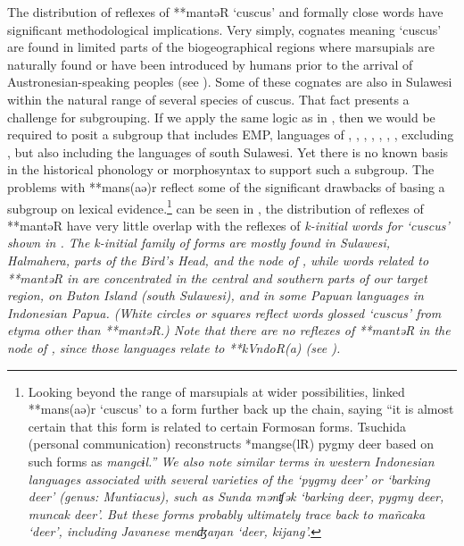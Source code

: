 The distribution of reflexes of **mantəR ‘cuscus’
and formally close words have significant methodological implications.
Very simply, cognates meaning ‘cuscus’ are found in limited parts
of the biogeographical regions where marsupials are naturally
found or have been introduced by humans prior to the arrival
of Austronesian-speaking peoples (see ).
Some of these cognates are also in Sulawesi within the natural
range of several species of cuscus.
That fact presents a challenge for subgrouping.
If we apply the same logic as in \citet{Blust1982,
Blust1993,Blust2009,Blust2012b}, then we would be required to posit a subgroup
that includes EMP, languages of , ,
, , , ,
, excluding ,
but also including the  languages of south Sulawesi.
Yet there is no known basis in the historical phonology or morphosyntax
to support such a subgroup.
The problems with **mans(aə)r reflect some of the significant
drawbacks of basing a subgroup on lexical evidence.\footnote{
		Looking beyond the range of marsupials at wider possibilities,
		\citet[143, endnote 72]{Collins1983} linked **mans(aə)r ‘cuscus’ to
		a form further back up the chain,
		saying “it is almost certain that this form is related to certain Formosan forms.
		Tsuchida (personal communication) reconstructs *mangse(lR) pygmy
		deer based on such forms as  \it{mangcɨl}.” We also note
		similar terms in western Indonesian languages associated with
		several varieties of the ‘pygmy deer’ or ‘barking deer’ (genus:
		\it{Muntiacus}), such as Sunda \it{mənʧək} ‘barking deer,
		pygmy deer, muncak deer’.
		But these forms probably ultimately trace back to  \it{mañcaka}
		‘deer’, including Javanese \it{menʤaŋan} ‘deer,
		kijang’.} 
 can be seen in ,
the distribution of reflexes of **mantəR have very little overlap
with the reflexes of \it{k}-initial words for ‘cuscus’ shown in .
The \it{k}-initial family of forms are mostly found in Sulawesi,
Halmahera, parts of the Bird's Head,
and the  node of ,
while words related to **mantəR in  are concentrated
in the central and southern parts of our target region,
on Buton Island (south Sulawesi),
and in some Papuan languages in Indonesian Papua.
(White circles or squares reflect words glossed ‘cuscus’ from
etyma other than **mantəR.) Note that there are no reflexes of
**mantəR in the  node of ,
since those languages relate to **kVndoR(a) (see ).

